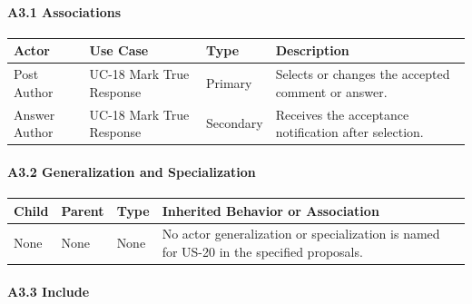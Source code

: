 \documentclass[12pt]{article}
\renewcommand{\baselinestretch}{1.5}
\begin{document}
\hypertarget{sec:a3-1-associations}{}
\paragraph*{A3.1 Associations}
\par\medskip

\begingroup
\small
\renewcommand{\baselinestretch}{1.0}\selectfont
\renewcommand{\arraystretch}{1.15}
\setlength{\tabcolsep}{6pt}
\begin{longtable}{|>{\raggedright\arraybackslash}p{}|>{\raggedright\arraybackslash}p{}|>{\raggedright\arraybackslash}p{}|>{\raggedright\arraybackslash}p{}|}
\hline
\textbf{Actor} & \textbf{Use Case} & \textbf{Type} & \textbf{Description} \\ \hline
\endhead
Post Author & UC-18 Mark True Response & Primary & Selects or changes the accepted comment or answer. \\ \hline
Answer Author & UC-18 Mark True Response & Secondary & Receives the acceptance notification after selection. \\ \hline
\end{longtable}
\endgroup
\par\medskip

\hypertarget{sec:a3-2-generalization-and-specialization}{}
\paragraph*{A3.2 Generalization and Specialization}
\par\medskip

\begingroup
\small
\renewcommand{\baselinestretch}{1.0}\selectfont
\renewcommand{\arraystretch}{1.15}
\setlength{\tabcolsep}{6pt}
\begin{longtable}{|>{\raggedright\arraybackslash}p{}|>{\raggedright\arraybackslash}p{}|>{\raggedright\arraybackslash}p{}|>{\raggedright\arraybackslash}p{}|}
\hline
\textbf{Child} & \textbf{Parent} & \textbf{Type} & \textbf{Inherited Behavior or Association} \\ \hline
\endhead
None & None & None & No actor generalization or specialization is named for US-20 in the specified proposals. \\ \hline
\end{longtable}
\endgroup
\par\medskip

\hypertarget{sec:a3-3-include}{}
\paragraph*{A3.3 Include}
\par\medskip
\end{document}
